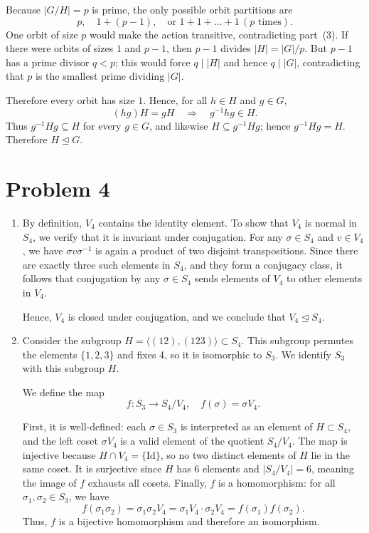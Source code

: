 \documentclass[12pt]{article}
\begin{document}
\begin{enumerate}[label=(\arabic*)]
Because \(|G/H| = p\) is prime, the only possible orbit partitions are
\[
p,\quad 1 + (p-1),\quad \text{or } 1 + 1 + \dots + 1 \,(p\text{ times}).
\]
One orbit of size \(p\) would make the action transitive, contradicting
part~(3).  
If there were orbits of sizes \(1\) and \(p-1\), then \(p-1\) divides
\(|H| = |G|/p\).  But \(p-1\) has a prime divisor \(q < p\); this would
force \(q\mid |H|\) and hence \(q\mid |G|\), contradicting that \(p\) is
the smallest prime dividing \(|G|\).

Therefore every orbit has size \(1\).  Hence, for all \(h\in H\) and
\(g\in G\),
\[
(hg)H = gH \quad\Longrightarrow\quad g^{-1}hg \in H.
\]
Thus \(g^{-1}Hg \subseteq H\) for every \(g\in G\), and likewise
\(H \subseteq g^{-1}Hg\); hence \(g^{-1}Hg = H\).  Therefore
\(H \trianglelefteq G\).

\section*{Problem 4}

\begin{enumerate}[label=(\arabic*)] 

\item

By definition, \( V_4 \) contains the identity element. To show that \( V_4 \) is normal in \( S_4 \), we verify that it is invariant under conjugation. 
For any \( \sigma \in S_4 \) and \( v \in V_4 \), we have \( \sigma v \sigma^{-1} \) is again a product of two disjoint transpositions. 
Since there are exactly three such elements in \( S_4 \), and they form a conjugacy class, it follows that conjugation by any \( \sigma \in S_4 \) sends elements of \( V_4 \) to other elements in \( V_4 \).

Hence, \( V_4 \) is closed under conjugation, and we conclude that \( V_4 \trianglelefteq S_4 \).

\item 
Consider the subgroup \( H = \langle (12), (123) \rangle \subset S_4 \). This subgroup permutes the elements \( \{1, 2, 3\} \) and fixes 4, so it is isomorphic to \( S_3 \). We identify \( S_3 \) with this subgroup \( H \).

\medskip

We define the map
\[
f : S_3 \to S_4 / V_4, \quad f(\sigma) = \sigma V_4.
\]

First, it is well-defined: each \( \sigma \in S_3 \) is interpreted as an element of \( H \subset S_4 \), and the left coset \( \sigma V_4 \) is a valid element of the quotient \( S_4 / V_4 \). The map is injective because \( H \cap V_4 = \{ \text{Id} \} \), so no two distinct elements of \( H \) lie in the same coset. It is surjective since \( H \) has 6 elements and \( |S_4 / V_4| = 6 \), meaning the image of \( f \) exhausts all cosets. Finally, \( f \) is a homomorphism: for all \( \sigma_1, \sigma_2 \in S_3 \), we have
\[
f(\sigma_1 \sigma_2) = \sigma_1 \sigma_2 V_4 = \sigma_1 V_4 \cdot \sigma_2 V_4 = f(\sigma_1) f(\sigma_2).
\]
Thus, \( f \) is a bijective homomorphism and therefore an isomorphism.


\end{enumerate}
\end{enumerate}
\end{document}
